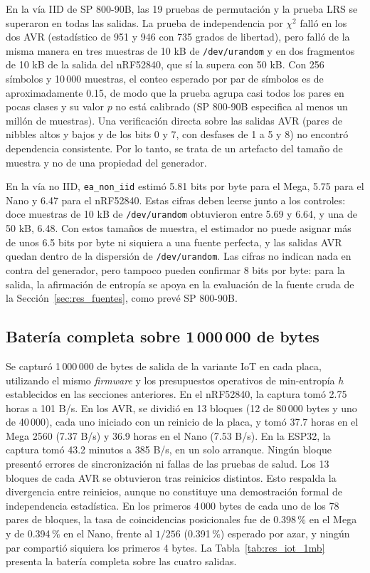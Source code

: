 En la vía IID de SP 800-90B, las 19 pruebas de permutación y la prueba LRS se superaron en todas las salidas. La prueba de independencia por $\chi^2$ falló en los dos AVR (estadístico de 951 y 946 con 735 grados de libertad), pero falló de la misma manera en tres muestras de 10 kB de \texttt{/dev/urandom} y en dos fragmentos de 10 kB de la salida del nRF52840, que sí la supera con 50 kB. Con 256 símbolos y 10\,000 muestras, el conteo esperado por par de símbolos es de aproximadamente 0.15, de modo que la prueba agrupa casi todos los pares en pocas clases y su valor $p$ no está calibrado (SP 800-90B especifica al menos un millón de muestras). Una verificación directa sobre las salidas AVR (pares de nibbles altos y bajos y de los bits 0 y 7, con desfases de 1 a 5 y 8) no encontró dependencia consistente. Por lo tanto, se trata de un artefacto del tamaño de muestra y no de una propiedad del generador.

En la vía no IID, \texttt{ea\_non\_iid} estimó 5.81 bits por byte para el Mega, 5.75 para el Nano y 6.47 para el nRF52840. Estas cifras deben leerse junto a los controles: doce muestras de 10 kB de \texttt{/dev/urandom} obtuvieron entre 5.69 y 6.64, y una de 50 kB, 6.48. Con estos tamaños de muestra, el estimador no puede asignar más de unos 6.5 bits por byte ni siquiera a una fuente perfecta, y las salidas AVR quedan dentro de la dispersión de \texttt{/dev/urandom}. Las cifras no indican nada en contra del generador, pero tampoco pueden confirmar 8 bits por byte: para la salida, la afirmación de entropía se apoya en la evaluación de la fuente cruda de la Sección~\ref{sec:res_fuentes}, como prevé SP 800-90B.

\subsection{Batería completa sobre 1\,000\,000 de bytes}

Se capturó 1\,000\,000 de bytes de salida de la variante IoT en cada placa, utilizando el mismo \textit{firmware} y los presupuestos operativos de min-entropía $h$ establecidos en las secciones anteriores. En el nRF52840, la captura tomó 2.75 horas a 101 B/s. En los AVR, se dividió en 13 bloques (12 de 80\,000 bytes y uno de 40\,000), cada uno iniciado con un reinicio de la placa, y tomó 37.7 horas en el Mega 2560 (7.37 B/s) y 36.9 horas en el Nano (7.53 B/s). En la ESP32, la captura tomó 43.2 minutos a 385 B/s, en un solo arranque. Ningún bloque presentó errores de sincronización ni fallas de las pruebas de salud. Los 13 bloques de cada AVR se obtuvieron tras reinicios distintos. Esto respalda la divergencia entre reinicios, aunque no constituye una demostración formal de independencia estadística. En los primeros 4\,000 bytes de cada uno de los 78 pares de bloques, la tasa de coincidencias posicionales fue de 0.398\,\% en el Mega y de 0.394\,\% en el Nano, frente al $1/256$ (0.391\,\%) esperado por azar, y ningún par compartió siquiera los primeros 4 bytes. La Tabla~\ref{tab:res_iot_1mb} presenta la batería completa sobre las cuatro salidas.

